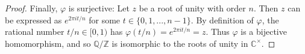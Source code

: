 \documentclass{article}
\begin{document}
\begin{enumerate}[label=(\alph*), itemsep=0em]
\begin{proof}
            Finally, $\varphi$ is surjective: Let $z$ be a root of unity with order $n$. Then $z$ can be expressed as $e^{2 \pi i t / n}$ for some $t \in \{ 0, 1, ..., n - 1 \}$. By definition of $\varphi$, the rational number $t/n \in [0, 1)$ has $\varphi(t/n) = e^{2 \pi i t / n} = z$. Thus $\varphi$ is a bijective homomorphism, and so $\mathbb{Q}/\mathbb{Z}$ is isomorphic to the roots of unity in $\mathbb{C}^\times$.
          \end{proof}
\end{enumerate}
\end{document}
